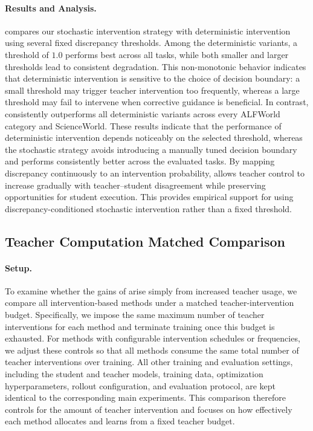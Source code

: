 \paragraph{Results and Analysis. }
 compares our stochastic intervention strategy with deterministic intervention using several fixed discrepancy thresholds.
Among the deterministic variants, a threshold of $1.0$ performs best across all tasks, while both smaller and larger thresholds lead to consistent degradation.
This non-monotonic behavior indicates that deterministic intervention is sensitive to the choice of decision boundary: a small threshold may trigger teacher intervention too frequently, whereas a large threshold may fail to intervene when corrective guidance is beneficial.
In contrast, \name consistently outperforms all deterministic variants across every ALFWorld category and ScienceWorld.
These results indicate that the performance of deterministic intervention depends noticeably on the selected threshold, whereas the stochastic strategy avoids introducing a manually tuned decision boundary and performs consistently better across the evaluated tasks.
By mapping discrepancy continuously to an intervention probability, \name allows teacher control to increase gradually with teacher--student disagreement while preserving opportunities for student execution.
This provides empirical support for using discrepancy-conditioned stochastic intervention rather than a fixed threshold.

\subsection{Teacher Computation Matched Comparison} \label{app:teacher_computation_matched} 

\paragraph{Setup.}
To examine whether the gains of \name arise simply from increased teacher usage, we compare all intervention-based methods under a matched teacher-intervention budget.
Specifically, we impose the same maximum number of teacher interventions for each method and terminate training once this budget is exhausted.
For methods with configurable intervention schedules or frequencies, we adjust these controls so that all methods consume the same total number of teacher interventions over training.
All other training and evaluation settings, including the student and teacher models, training data, optimization hyperparameters, rollout configuration, and evaluation protocol, are kept identical to the corresponding main experiments.
This comparison therefore controls for the amount of teacher intervention and focuses on how effectively each method allocates and learns from a fixed teacher budget.


